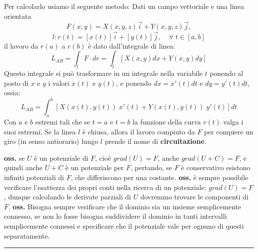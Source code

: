 \begin{itemize}
\[    \]
    Per calcolarlo usiamo il seguente metodo:\newline
    Dati un campo vettoriale e una linea orientata
    \[
        F(x,y) = X(x,y,z) \vec{i} + Y(x,y,z)\vec{j},
    \]
    \[
        l: r(t) = [x(t)]\vec{i} + [y(t)]\vec{j}, \;\;\; \;\forall\;t \in[a,b]
    \]
    il lavoro da $r(a)$ a $r(b)$ è dato dall'integrale di linea:
    \[
        L_{AB}= \int_{l} F \cdot  dr = \int_{l}[X(x,y)dx + Y(x,y)dy]
    \]
    Questo integrale si può trasformare in un integrale nella variabile $t$ ponendo al posto di $x$ e $y$ i valori $x(t)$ e $y(t)$, e ponendo $dx = x'(t) dt$ e $dy = y'(t) dt$, ossia:
    \[
        L_{AB} = \int_{a}^{b} \left[X(x(t), y(t)) \; x'(t) + Y(x(t),y(t)) \;y'(t)\right]dt
    \]
    Con $a$ e $b$ estremi tali che se $t=a$ e $t=b$ la funzione della curva $r(t)$ valga i suoi estremi.\newline
    \newline
    Se la linea $l$ è chiusa, allora il lavoro compiuto da $F$ per compiere un giro (in senso antiorario) lungo $l$ prende il nome di \textbf{circuitazione}.
\end{itemize}
\textbf{oss.} se $U$ è un potenziale di $F$, cioè $grad(U) = F$, anche $grad(U+C) = F$, e quindi anche $U+C$ è un potenziale per $F$, pertando, se $F$ è conservativo esistono infiniti potenziali di $F$, che differiscono per una costante.\newline
\newline
\textbf{oss.} è sempre possibile  verificare l'esattezza dei propri conti nella ricerca di un potenziale: $grad(U) = F$, dunque calcolando le derivate parziali di $U$ dovremmo trovare le componenti di $F$.\newline
\newline
\textbf{oss.} Bisogna sempre verificare che il dominio sia un insieme semplicemente connesso, se non lo fosse bisogna suddividere il dominio in tanti intervalli semplicemente connessi e specificare che il potenziale vale per ognuno di questi separatamente.\newline
\rule{\textwidth}{0,4pt}
